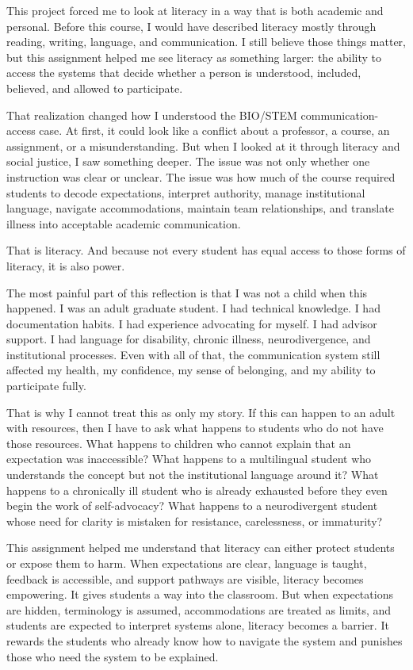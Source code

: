 \documentclass[12pt]{article}
\begin{document}
This project forced me to look at literacy in a way that is both academic and personal. Before this course, I would have described literacy mostly through reading, writing, language, and communication. I still believe those things matter, but this assignment helped me see literacy as something larger: the ability to access the systems that decide whether a person is understood, included, believed, and allowed to participate.

That realization changed how I understood the BIO/STEM communication-access case. At first, it could look like a conflict about a professor, a course, an assignment, or a misunderstanding. But when I looked at it through literacy and social justice, I saw something deeper. The issue was not only whether one instruction was clear or unclear. The issue was how much of the course required students to decode expectations, interpret authority, manage institutional language, navigate accommodations, maintain team relationships, and translate illness into acceptable academic communication.

That is literacy. And because not every student has equal access to those forms of literacy, it is also power.

The most painful part of this reflection is that I was not a child when this happened. I was an adult graduate student. I had technical knowledge. I had documentation habits. I had experience advocating for myself. I had advisor support. I had language for disability, chronic illness, neurodivergence, and institutional processes. Even with all of that, the communication system still affected my health, my confidence, my sense of belonging, and my ability to participate fully.

That is why I cannot treat this as only my story. If this can happen to an adult with resources, then I have to ask what happens to students who do not have those resources. What happens to children who cannot explain that an expectation was inaccessible? What happens to a multilingual student who understands the concept but not the institutional language around it? What happens to a chronically ill student who is already exhausted before they even begin the work of self-advocacy? What happens to a neurodivergent student whose need for clarity is mistaken for resistance, carelessness, or immaturity?

This assignment helped me understand that literacy can either protect students or expose them to harm. When expectations are clear, language is taught, feedback is accessible, and support pathways are visible, literacy becomes empowering. It gives students a way into the classroom. But when expectations are hidden, terminology is assumed, accommodations are treated as limits, and students are expected to interpret systems alone, literacy becomes a barrier. It rewards the students who already know how to navigate the system and punishes those who need the system to be explained.
\end{document}
